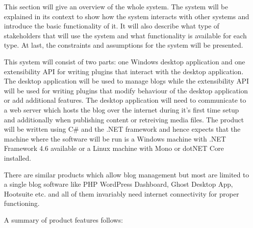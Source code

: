 
This section will give an overview of the whole system. The system will be explained in its context to show how the
system interacts with other systems and introduce the basic functionality of it. It will also describe what type of
stakeholders that will use the system and what functionality is available for each type. At last, the constraints and
assumptions for the system will be presented.


This system will consist of two parts: one Windows desktop application and one extensibility API for writing plugins
that interact with the desktop application. The desktop application will be used to manage blogs while the extensibility
API will be used for writing plugins that modify behaviour of the desktop application or add additional features. The
desktop application will need to communicate to a web server which hosts the blog over the internet during it's first
time setup and additionally when publishing content or retreiving media files. The product will be written using C\# and
the .NET framework and hence expects that the machine where the software will be run is a Windows machine with .NET
Framework 4.6 available or a Linux machine with Mono or dotNET Core installed.

There are similar products which allow blog management but most are limited to a single blog software like PHP WordPress
Dashboard, Ghost Desktop App, Hootsuite etc. and all of them invariably need internet connectivity for proper
functioning.


A summary of product features follows:

